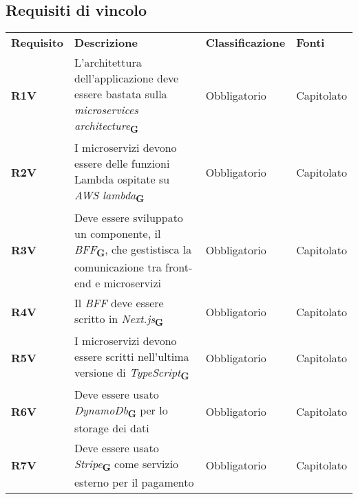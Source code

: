 \newpage
\subsection{Requisiti di vincolo}
\begin{center}
    \centering
    \renewcommand{\arraystretch}{1.8}
    \label{tab:RequisitiVincolo}
    \begin{longtable}[!h]{p{50px} p{200px} p{100px} p{50px}}
        \rowcolor{logo!70} \textbf{Requisito} & \textbf{Descrizione}                                                                                                 & \textbf{Classificazione} & \textbf{Fonti} \\
        \textbf{R1V}                          & L'architettura dell'applicazione deve essere bastata sulla \textit{microservices architecture}\textsubscript{\textbf{G}}                                & Obbligatorio             & Capitolato     \\
        \textbf{R2V}                          & I microservizi devono essere delle funzioni \newline Lambda ospitate su \textit{AWS lambda}\textsubscript{\textbf{G}}                          & Obbligatorio             & Capitolato     \\
        \textbf{R3V}                          & Deve essere sviluppato un componente, il \textit{BFF}\textsubscript{\textbf{G}}, che gestistisca la comunicazione tra front-end e microservizi & Obbligatorio             & Capitolato     \\
        \textbf{R4V}                          & Il \textit{BFF} deve essere scritto in \textit{Next.js}\textsubscript{\textbf{G}}                                                              & Obbligatorio             & Capitolato     \\
        \textbf{R5V}                          & I microservizi devono essere scritti nell'ultima versione di \textit{TypeScript}\textsubscript{\textbf{G}}                                     & Obbligatorio             & Capitolato     \\
        \textbf{R6V}                          & Deve essere usato \textit{DynamoDb}\textsubscript{\textbf{G}} per lo storage dei dati                                                          & Obbligatorio             & Capitolato     \\
        \textbf{R7V}                          & Deve essere usato \textit{Stripe}\textsubscript{\textbf{G}} come servizio esterno per il pagamento                                             & Obbligatorio             & Capitolato     \\

\end{longtable}
\end{center}
